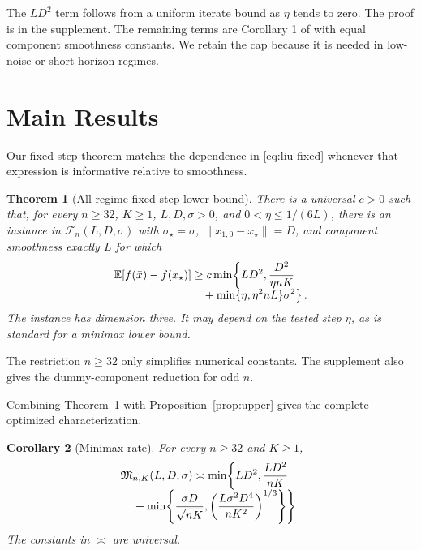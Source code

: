 \documentclass[twoside]{article}
\newtheorem{theorem}{Theorem}
\newtheorem{corollary}[theorem]{Corollary}
\newcommand{\E}{\mathbb E}
\newcommand{\cF}{\mathcal F}
\begin{document}
The $LD^2$ term follows from a uniform iterate bound as $\eta$ tends to zero.
The proof is in the supplement. The remaining terms are Corollary 1 of
\citet{liu2026dominates} with equal component smoothness constants. We retain
the cap because it is needed in low-noise or short-horizon regimes.

\section{Main Results}
\label{sec:results}

Our fixed-step theorem matches the dependence in \eqref{eq:liu-fixed} whenever
that expression is informative relative to smoothness.

\begin{theorem}[All-regime fixed-step lower bound]
\label{thm:fixed}
There is a universal $c>0$ such that, for every $n\ge32$, $K\ge1$,
$L,D,\sigma>0$, and $0<\eta\le1/(6L)$, there is an instance in
$\cF_n(L,D,\sigma)$ with $\sigma_\star=\sigma$,
$\lVert x_{1,0}-x_\star\rVert=D$, and component smoothness exactly $L$ for
which
\begin{align}
 \E[f(\bar x)-f(x_\star)]
 \ge c\min\!\left\{LD^2,\frac{D^2}{\eta nK}\right.\quad\notag\\[-1ex]
 \left.{}+\min\{\eta,\eta^2nL\}\sigma^2\right\}.
 \label{eq:fixed-lower}
\end{align}
The instance has dimension three. It may depend on the tested step $\eta$,
as is standard for a minimax lower bound.
\end{theorem}

The restriction $n\ge32$ only simplifies numerical constants. The supplement
also gives the dummy-component reduction for odd $n$.

Combining Theorem~\ref{thm:fixed} with
Proposition~\ref{prop:upper} gives the complete optimized characterization.

\begin{corollary}[Minimax rate]
\label{cor:minimax}
For every $n\ge32$ and $K\ge1$,
\begin{align}
 \mathfrak M_{n,K}(L,D,\sigma)
 \asymp
 \min\!\left\{LD^2,\frac{LD^2}{nK}\right.\quad\notag\\[-1ex]
 \left.{}+\min\!\left\{
 \frac{\sigma D}{\sqrt{nK}},
 \left(\frac{L\sigma^2D^4}{nK^2}\right)^{1/3}
 \right\}\right\}.
 \label{eq:minimax-rate}
\end{align}
The constants in $\asymp$ are universal.
\end{corollary}
\end{document}

